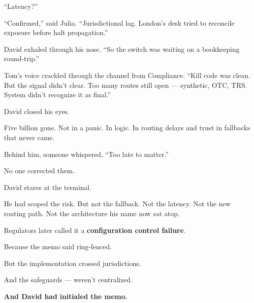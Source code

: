 “Latency?”

“Confirmed,” said Julia. “Jurisdictional lag. London’s desk tried to reconcile exposure before halt propagation.”

David exhaled through his nose. “So the switch was waiting on a bookkeeping round-trip.”

Tom’s voice crackled through the channel from Compliance. “Kill code was clean. But the signal didn’t clear.  
Too many routes still open — synthetic, OTC, TRS. System didn’t recognize it as final.”

David closed his eyes.

Five billion gone. Not in a panic. In logic. In routing delays and trust in fallbacks that never came.

Behind him, someone whispered, “Too late to matter.”

No one corrected them.

David stares at the terminal.

He had scoped the risk.  But not the fallback.
Not the latency.
Not the new routing path.
Not the architecture his name now sat atop.

Regulators later called it a \textbf{configuration control failure}.

Because the memo said ring-fenced.

But the implementation crossed jurisdictions.

And the safeguards — weren’t centralized.

\textbf{And David had initialed the memo.}

\medskip

